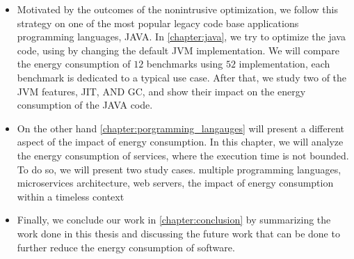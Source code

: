 \begin{itemize}
    \item Motivated by the outcomes of the nonintrusive optimization, we follow this strategy on one of the most popular legacy code base applications programming languages, JAVA. In \cref{chapter:java}, we try to optimize the java code, using by changing the default JVM implementation. We will compare the energy consumption of $12$ benchmarks using $52$ implementation, each benchmark is dedicated to a typical use case. After that, we study two of the JVM features, JIT, AND GC, and show their impact on the energy consumption of the JAVA code.
    \item On the other hand \cref{chapter:porgramming_langauges} will present a different aspect of the impact of energy consumption. In this chapter, we will analyze the energy consumption of services, where the execution time is not bounded. To do so, we will present two study cases.
    multiple programming languages, microservices architecture, web servers, the impact of energy consumption within a timeless context  
    \item Finally, we conclude our work in \cref{chapter:conclusion} by summarizing the work done in this thesis and discussing the future work that can be done to further reduce the energy consumption of software.
\end{itemize}




